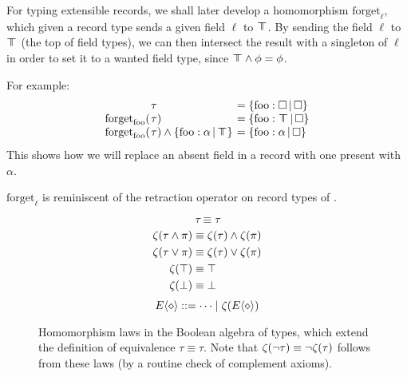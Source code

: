 \begin{example}
    For typing extensible records, we shall later develop a homomorphism $\mathrm{forget}_\ell$, which given a record type sends a given field $\ell$ to $\top \!\!\!\! \top$.
    By sending the field $\ell$ to $\top \!\!\!\! \top$ (the top of field types), we can then intersect the result with a singleton of $\ell$ in order to set it to a wanted field type, since $\top \!\!\!\! \top \land \phi = \phi$. 
    
    For example:
    \setlength{\tabcolsep}{0pt}
    $$\begin{array}{rll}
        &\hspace{-0.9em}\tau &\;\hspace{-0.9em}= \flext{\mathrm{foo}: \flabsent}{\flabsent} \\
        \mathrm{forget}_\mathrm{foo}( &\hspace{-0.9em}\tau ) &\;\hspace{-0.9em}= \flext{\mathrm{foo}: \flftop}{\flabsent} \\
        \mathrm{forget}_\mathrm{foo}( &\hspace{-0.9em}\tau ) \meet \flext{\mathrm{foo}: \alpha}{\flftop} &\;\hspace{-0.9em}= \flext{\mathrm{foo}: \alpha}{\flabsent}
    \end{array}$$
    This shows how we will replace an absent field in a record with one present with $\alpha$.

    $\mathrm{forget}_\ell$ is reminiscent of the retraction operator on record types of \textcite{operations-on-records}.
\end{example}

\begin{figure}
    \centering
    $$\boxed{\tau \equiv \tau}$$
    \vspace{-2em}
    \begin{align*}
        \zeta(\tau \land \pi) &\equiv \zeta(\tau) \land \zeta(\pi) \\
        \zeta(\tau \lor \pi) &\equiv \zeta(\tau) \lor \zeta(\pi) \\
        \zeta(\top) &\equiv \top \\
        \zeta(\bot) &\equiv \bot
    \end{align*}
    \vspace{-1em}
    $$ \equivctx ::= \cdots \mid \morph(\equivctx) $$
    \caption{Homomorphism laws in the Boolean algebra of types, which extend the definition of equivalence $\tau \equiv \tau$. Note that $\zeta(\lnot \tau) \equiv \lnot \zeta(\tau)$ follows from these laws (by a routine check of complement axioms).}
    \label{fig:morphism-laws}
\end{figure}

